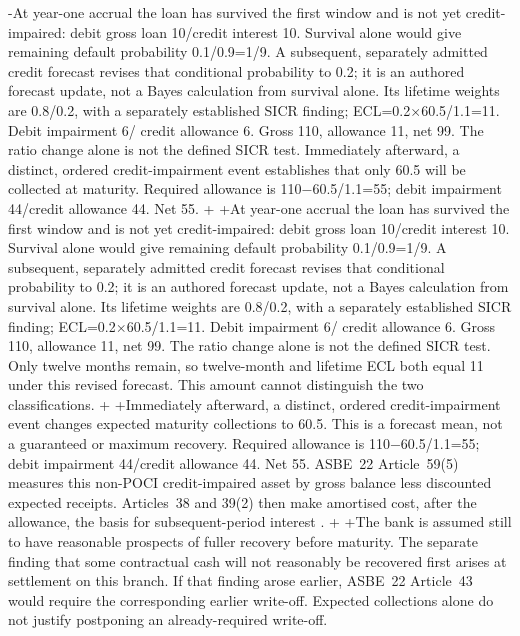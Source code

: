 -At year-one accrual the loan has survived the first window and is not yet credit-impaired: debit gross loan 10/credit interest 10. Survival alone would give remaining default probability 0.1/0.9=1/9. A subsequent, separately admitted credit forecast revises that conditional probability to 0.2; it is an authored forecast update, not a Bayes calculation from survival alone. Its lifetime weights are 0.8/0.2, with a separately established SICR finding; ECL=0.2\ensuremath{\times}60.5/1.1=11. Debit impairment 6/ credit allowance 6. Gross 110, allowance 11, net 99. The ratio change alone is not the defined SICR test. Immediately afterward, a distinct, ordered credit-impairment event establishes that only 60.5 will be collected at maturity. Required allowance is 110\ensuremath{-}60.5/1.1=55; debit impairment 44/credit allowance 44. Net 55.
+\enlargethispage{\baselineskip}
+At year-one accrual the loan has survived the first window and is not yet credit-impaired: debit gross loan 10/credit interest 10. Survival alone would give remaining default probability 0.1/0.9=1/9. A subsequent, separately admitted credit forecast revises that conditional probability to 0.2; it is an authored forecast update, not a Bayes calculation from survival alone. Its lifetime weights are 0.8/0.2, with a separately established SICR finding; ECL=0.2\ensuremath{\times}60.5/1.1=11. Debit impairment 6/ credit allowance 6. Gross 110, allowance 11, net 99. The ratio change alone is not the defined SICR test. Only twelve months remain, so twelve-month and lifetime ECL both equal 11 under this revised forecast. This amount cannot distinguish the two classifications.
+
+Immediately afterward, a distinct, ordered credit-impairment event changes expected maturity collections to 60.5. This is a forecast mean, not a guaranteed or maximum recovery. Required allowance is 110\ensuremath{-}60.5/1.1=55; debit impairment 44/credit allowance 44. Net 55. ASBE~22 Article~59(5) measures this non-POCI credit-impaired asset by gross balance less discounted expected receipts. Articles~38 and 39(2) then make amortised cost, after the allowance, the basis for subsequent-period interest \citep{mofasbe22}.
+
+The bank is assumed still to have reasonable prospects of fuller recovery before maturity. The separate finding that some contractual cash will not reasonably be recovered first arises at settlement on this branch. If that finding arose earlier, ASBE~22 Article~43 would require the corresponding earlier write-off. Expected collections alone do not justify postponing an already-required write-off.
 
